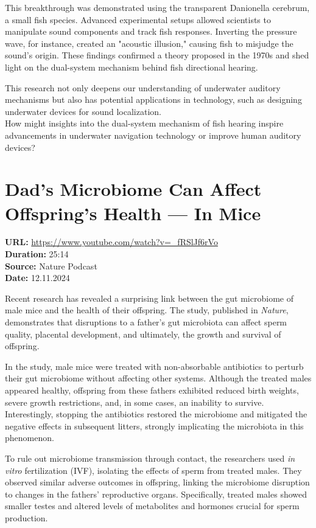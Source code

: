 \documentclass[12pt]{article}
\begin{document}
This breakthrough was demonstrated using the transparent Danionella cerebrum, a small fish species. Advanced experimental setups allowed scientists to manipulate sound components and track fish responses. Inverting the pressure wave, for instance, created an "acoustic illusion," causing fish to misjudge the sound’s origin. These findings confirmed a theory proposed in the 1970s and shed light on the dual-system mechanism behind fish directional hearing.

This research not only deepens our understanding of underwater auditory mechanisms but also has potential applications in technology, such as designing underwater devices for sound localization.\\[5px]


How might insights into the dual-system mechanism of fish hearing inspire advancements in underwater navigation technology or improve human auditory devices?






\newpage

\section{Dad's Microbiome Can Affect Offspring's Health — In Mice}
\textbf{URL:} \url{https://www.youtube.com/watch?v=_fRSlJf6rVo}\\
\textbf{Duration:} 25:14\\
\textbf{Source:} Nature Podcast\\
\textbf{Date:} 12.11.2024


Recent research has revealed a surprising link between the gut microbiome of male mice and the health of their offspring. The study, published in \textit{Nature}, demonstrates that disruptions to a father’s gut microbiota can affect sperm quality, placental development, and ultimately, the growth and survival of offspring.  

In the study, male mice were treated with non-absorbable antibiotics to perturb their gut microbiome without affecting other systems. Although the treated males appeared healthy, offspring from these fathers exhibited reduced birth weights, severe growth restrictions, and, in some cases, an inability to survive. Interestingly, stopping the antibiotics restored the microbiome and mitigated the negative effects in subsequent litters, strongly implicating the microbiota in this phenomenon.  

To rule out microbiome transmission through contact, the researchers used \textit{in vitro} fertilization (IVF), isolating the effects of sperm from treated males. They observed similar adverse outcomes in offspring, linking the microbiome disruption to changes in the fathers' reproductive organs. Specifically, treated males showed smaller testes and altered levels of metabolites and hormones crucial for sperm production.  
\end{document}
